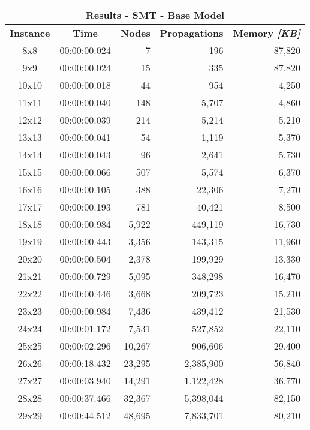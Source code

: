 
\begin{center}
    \begin{tabular}{|c|c|r|r|r|}
        \hline
        \multicolumn{5}{|c|}{\textbf{Results - SMT - Base Model}} \\
        \hline
        \textbf{Instance} & \textbf{Time} & \textbf{Nodes} & \textbf{Propagations} & \textbf{Memory \textit{[KB]}} \\
        
        \hline
		8x8 & 00:00:00.024 & 7 & 196 & 87,820 \\ \hline
		9x9 & 00:00:00.024 & 15 & 335 & 87,820 \\ \hline
		10x10 & 00:00:00.018 & 44 & 954 & 4,250 \\ \hline
		11x11 & 00:00:00.040 & 148 & 5,707 & 4,860 \\ \hline
		12x12 & 00:00:00.039 & 214 & 5,214 & 5,210 \\ \hline
		13x13 & 00:00:00.041 & 54 & 1,119 & 5,370 \\ \hline
		14x14 & 00:00:00.043 & 96 & 2,641 & 5,730 \\ \hline
		15x15 & 00:00:00.066 & 507 & 5,574 & 6,370 \\ \hline
		16x16 & 00:00:00.105 & 388 & 22,306 & 7,270 \\ \hline
		17x17 & 00:00:00.193 & 781 & 40,421 & 8,500 \\ \hline
		18x18 & 00:00:00.984 & 5,922 & 449,119 & 16,730 \\ \hline
		19x19 & 00:00:00.443 & 3,356 & 143,315 & 11,960 \\ \hline
		20x20 & 00:00:00.504 & 2,378 & 199,929 & 13,330 \\ \hline
		21x21 & 00:00:00.729 & 5,095 & 348,298 & 16,470 \\ \hline
		22x22 & 00:00:00.446 & 3,668 & 209,723 & 15,210 \\ \hline
		23x23 & 00:00:00.984 & 7,436 & 439,412 & 21,530 \\ \hline
		24x24 & 00:00:01.172 & 7,531 & 527,852 & 22,110 \\ \hline
		25x25 & 00:00:02.296 & 10,267 & 906,606 & 29,400 \\ \hline
		26x26 & 00:00:18.432 & 23,295 & 2,385,900 & 56,840 \\ \hline
		27x27 & 00:00:03.940 & 14,291 & 1,122,428 & 36,770 \\ \hline
		28x28 & 00:00:37.466 & 32,367 & 5,398,044 & 82,150 \\ \hline
		29x29 & 00:00:44.512 & 48,695 & 7,833,701 & 80,210 \\ \hline

\end{tabular}
\end{center}
